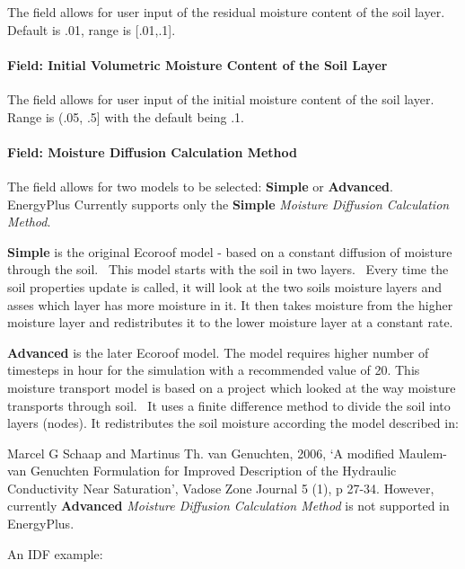The field allows for user input of the residual moisture content of the soil layer. Default is .01, range is {[}.01,.1{]}.

\paragraph{Field: Initial Volumetric Moisture Content of the Soil Layer}\label{field-initial-volumetric-moisture-content-of-the-soil-layer}

The field allows for user input of the initial moisture content of the soil layer. Range is (.05, .5{]} with the default being .1.

\paragraph{Field: Moisture Diffusion Calculation Method}\label{field-moisture-diffusion-calculation-method}

The field allows for two models to be selected: \textbf{Simple} or \textbf{Advanced}. EnergyPlus Currently supports only the \textbf{Simple} \textit{Moisture Diffusion Calculation Method}.

\textbf{Simple} is the original Ecoroof model - based on a constant diffusion of moisture through the soil.~ This model starts with the soil in two layers.~ Every time the soil properties update is called, it will look at the two soils moisture layers and asses which layer has more moisture in it. It then takes moisture from the higher moisture layer and redistributes it to the lower moisture layer at a constant rate.

\textbf{Advanced} is the later Ecoroof model. The model requires higher number of timesteps in hour for the simulation with a recommended value of 20. This moisture transport model is based on a project which looked at the way moisture transports through soil.~ It uses a finite difference method to divide the soil into layers (nodes). It redistributes the soil moisture according the model described in:

Marcel G Schaap and Martinus Th. van Genuchten, 2006, `A modified Maulem-van Genuchten Formulation for Improved Description of the Hydraulic Conductivity Near Saturation', Vadose Zone Journal 5 (1), p 27-34. However, currently \textbf{Advanced} \textit{Moisture Diffusion Calculation Method} is not supported in EnergyPlus.

An IDF example:

